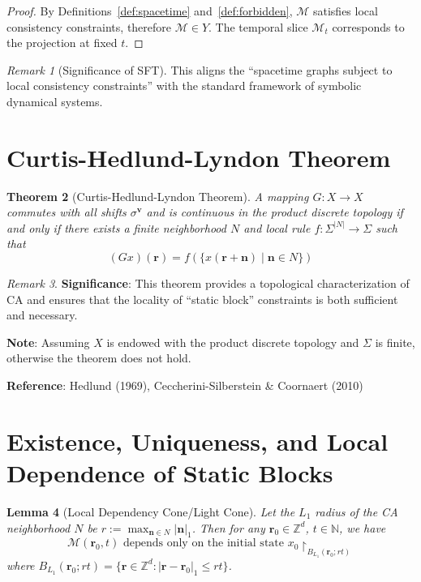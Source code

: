 \documentclass[11pt]{article}
\newtheorem{theorem}{Theorem}[section]
\newtheorem{lemma}[theorem]{Lemma}
\theoremstyle{definition}
\theoremstyle{remark}
\newtheorem{remark}[theorem]{Remark}
\begin{document}
\begin{proof}
By Definitions~\ref{def:spacetime} and~\ref{def:forbidden}, \( \mathcal{M} \) satisfies local consistency constraints, therefore \( \mathcal{M} \in Y \). The temporal slice \( \mathcal{M}_t \) corresponds to the projection at fixed \( t \).
\end{proof}

\begin{remark}[Significance of SFT]
This aligns the ``spacetime graphs subject to local consistency constraints'' with the standard framework of symbolic dynamical systems.
\end{remark}

\section{Curtis-Hedlund-Lyndon Theorem}\label{sec:curtis}

\begin{theorem}[Curtis-Hedlund-Lyndon Theorem]\label{thm:curtis}
A mapping \( G: X \to X \) commutes with all shifts \( \sigma^\mathbf{v} \) and is continuous in the product discrete topology if and only if there exists a finite neighborhood \( N \) and local rule \( f: \Sigma^{|N|} \to \Sigma \) such that
\[
(G x)(\mathbf{r}) = f\left( \{ x(\mathbf{r} + \mathbf{n}) \mid \mathbf{n} \in N \} \right)
\]
\end{theorem}

\begin{remark}
\textbf{Significance}: This theorem provides a topological characterization of CA and ensures that the locality of ``static block'' constraints is both sufficient and necessary.

\textbf{Note}: Assuming \( X \) is endowed with the product discrete topology and \( \Sigma \) is finite, otherwise the theorem does not hold.

\textbf{Reference}: Hedlund (1969), Ceccherini-Silberstein \& Coornaert (2010)
\end{remark}

\section{Existence, Uniqueness, and Local Dependence of Static Blocks}\label{sec:existence}

\begin{lemma}[Local Dependency Cone/Light Cone]\label{lem:lightcone}
Let the \( L_1 \) radius of the CA neighborhood \( N \) be \( r := \max_{\mathbf{n} \in N} |\mathbf{n}|_1 \). Then for any \( \mathbf{r}_0 \in \mathbb{Z}^d \), \( t \in \mathbb{N} \), we have
\[
\mathcal{M}(\mathbf{r}_0, t) \text{ depends only on the initial state } x_0 \restriction_{B_{L_1}(\mathbf{r}_0; rt)}
\]
where \( B_{L_1}(\mathbf{r}_0; rt) = \{ \mathbf{r} \in \mathbb{Z}^d : |\mathbf{r} - \mathbf{r}_0|_1 \le rt \} \).
\end{lemma}
\end{document}
